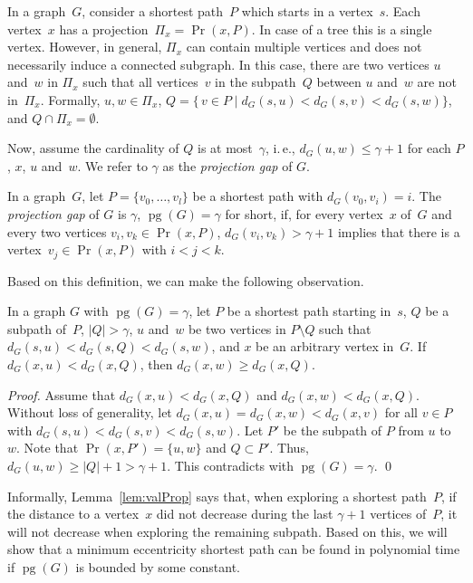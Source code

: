 \documentclass[10pt]{llncs}
\makeatletter
\newcommand{\ie}{i.\,e.\@ifnextchar{,}{}{~}}
\DeclareMathOperator{\pg}{pg}
\makeatother
\begin{document}
In a graph~$G$, consider a shortest path~$P$ which starts in a vertex~$s$.
Each vertex~$x$ has a projection~$\Pi_x = \Pr(x, P)$.
In case of a tree this is a single vertex.
However, in general, $\Pi_x$ can contain multiple vertices and does not necessarily induce a connected subgraph.
In this case, there are two vertices $u$ and~$w$ in $\Pi_x$ such that all vertices~$v$ in the subpath~$Q$ between $u$ and~$w$ are not in~$\Pi_x$.
Formally, $u,w \in \Pi_x$, $Q = \{ \, v \in P \mid d_G(s,u) < d_G(s,v) < d_G(s, w) \}$, and $Q \cap \Pi_x = \emptyset$.

Now, assume the cardinality of $Q$ is at most~$\gamma$, \ie, $d_G(u,w) \leq \gamma + 1$ for each $P$, $x$, $u$ and~$w$.
We refer to $\gamma$ as the \emph{projection gap} of $G$.

\begin{definition}
In a graph~$G$, let $P = \{ v_0, \ldots, v_l \}$ be a shortest path with $d_G(v_0, v_i) = i$.
The \emph{projection gap} of $G$ is $\gamma$, $\pg(G) = \gamma$ for short, if, for every vertex~$x$ of~$G$ and every two vertices $v_i, v_k \in \Pr(x, P)$, $d_G(v_i, v_k) > \gamma + 1$ implies that there is a vertex~$v_j \in \Pr(x, P)$ with $i < j < k$.
\end{definition}

Based on this definition, we can make the following observation.

\begin{lemma}
    \label{lem:valProp}
In a graph $G$ with $\pg(G) = \gamma$, let $P$ be a shortest path starting in~$s$, $Q$ be a subpath of~$P$, $|Q| > \gamma$, $u$ and~$w$ be two vertices in $P \setminus Q$ such that $d_G(s, u) < d_G(s,Q) < d_G(s, w)$, and $x$ be an arbitrary vertex in~$G$.
If $d_G(x, u) < d_G(x, Q)$, then $d_G(x, w) \geq d_G(x, Q)$.
\end{lemma}

\begin{proof}
Assume that $d_G(x, u) < d_G(x, Q)$ and $d_G(x, w) < d_G(x, Q)$.
Without loss of generality, let $d_G(x, u) = d_G(x, w) < d_G(x, v)$ for all $v \in P$ with $d_G(s,u) < d_G(s,v) < d_G(s, w)$.
Let $P'$ be the subpath of $P$ from $u$ to~$w$.
Note that $\Pr(x, P') = \{ u, w \}$ and $Q \subset P'$.
Thus, $d_G(u, w) \geq |Q| + 1 > \gamma + 1$.
This contradicts with $\pg(G) = \gamma$.
\qed
\end{proof}

Informally, Lemma~\ref{lem:valProp} says that, when exploring a shortest path~$P$, if the distance to a vertex~$x$ did not decrease during the last $\gamma + 1$ vertices of~$P$, it will not decrease when exploring the remaining subpath.
Based on this, we will show that a minimum eccentricity shortest path can be found in polynomial time if $\pg(G)$ is bounded by some constant.
\end{document}
